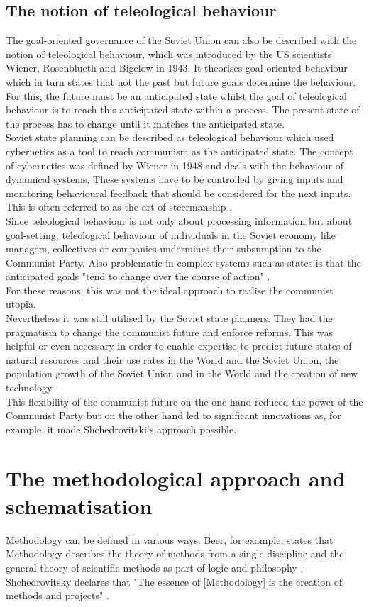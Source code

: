 \documentclass[11pt,a4paper]{article}
\begin{document}
\subsection{The notion of teleological behaviour}
The goal-oriented governance of the Soviet Union can also be described with the notion of teleological behaviour, which was introduced by the US scientists Wiener, Rosenblueth and Bigelow in 1943. It theorises goal-oriented behaviour which in turn states that not the past but future goals determine the behaviour. For this, the future must be an anticipated state whilst the goal of teleological behaviour is to reach this anticipated state within a process. The present state of the process has to change until it matches the anticipated state. \\
Soviet state planning can be described as teleological behaviour which used cybernetics as a tool to reach communism as the anticipated state. The concept of cybernetics was defined by Wiener in 1948 and deals with the behaviour of dynamical systems. These systems have to be controlled by giving inputs and monitoring behavioural feedback that should be considered for the next inputs. This is often referred to as the art of steermanship \cite{Wiener}. \\
Since teleological behaviour is not only about processing information but about goal-setting, teleological behaviour of individuals in the Soviet economy like managers, collectives or companies undermines their subsumption to the Communist Party. Also problematic in complex systems such as states is that the anticipated goals "tend to change over the course of action" \cite[p. 5]{Rindzeviit2015}.  \\
For these reasons, this was not the ideal approach to realise the communist utopia.  \\
Nevertheless it was still utilised by the Soviet state planners. They had the pragmatism to change the communist future and enforce reforms. This was helpful or even necessary in order to enable expertise to predict future states of natural resources and their use rates in the World and the Soviet Union, the population growth of the Soviet Union and in the World and the creation of new technology. \\
This flexibility of the communist future on the one hand reduced the power of the Communist Party but on the other hand led to significant innovations as, for example, it made Shchedrovitski’s approach possible.


\section{The methodological approach and schematisation}
Methodology can be defined in various ways. Beer, for example, states that Methodology describes the theory of methods from a single discipline and the general theory of scientific methods as part of logic and philosophy \cite[p. 9]{Beer}. \\
Shchedrovitsky declares that "The essence of [Methodology] is the creation of methods and projects" \cite[p. 7]{Principles}. 
\end{document}
